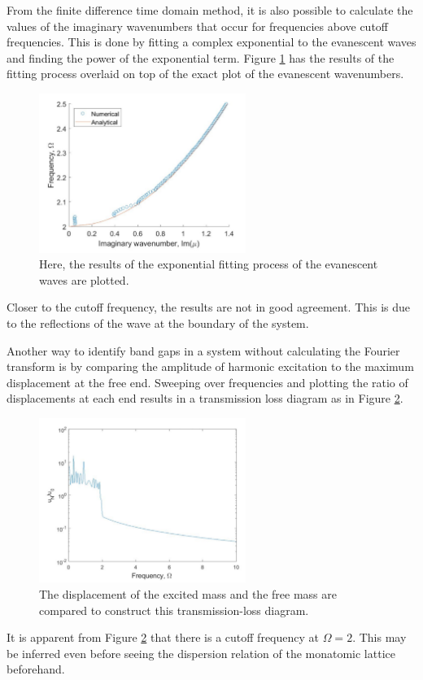 \documentclass{article}
\begin{document}
From the finite difference time domain method, it is also possible to calculate 
the values of the imaginary wavenumbers that occur for frequencies above cutoff 
frequencies. This is done by fitting a complex exponential to the evanescent 
waves and finding the power of the exponential term. Figure 
\ref{fig:imagwavenumres} has the results of 
the fitting process overlaid on top of the exact plot of the evanescent 
wavenumbers. 
\begin{figure}[!htbp]
	\centering
	\includegraphics[width=0.6\textwidth]{im-wavenum-res.pdf}
	\caption{Here, the results of the exponential fitting process of the 
	evanescent waves are plotted.}
	\label{fig:imagwavenumres}
\end{figure}
Closer to the cutoff frequency, the results are not in good agreement. This is 
due to the reflections of the wave at the boundary of the system. 

Another way to identify band gaps in a system without calculating the Fourier 
transform is by comparing the amplitude of harmonic excitation to 
the maximum displacement at the free end. Sweeping over frequencies and 
plotting the 
ratio of displacements at each end results in a transmission loss diagram as in 
Figure \ref{fig:tlms}.
\begin{figure}[!htbp]
	\centering
	\includegraphics[width=0.6\textwidth]{tl-diag.pdf}
	\caption{The displacement of the excited mass and the free mass are 
	compared to construct this transmission-loss diagram.}
	\label{fig:tlms}
\end{figure}
It is apparent from Figure \ref{fig:tlms} that there is a cutoff frequency at 
$\Omega=2$. This may be inferred even before seeing the dispersion relation of 
the monatomic lattice beforehand.
\end{document}
